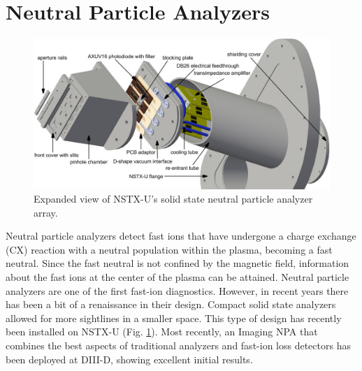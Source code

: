 \section{Neutral Particle Analyzers}
\begin{figure}[ht]
    \centering
    \includegraphics[width=12cm]{figures/nstx_npa.jpeg}
    \caption{Expanded view of NSTX-U's solid state neutral particle analyzer array.\cite{liu2014design}}
    \label{fig:npa}
\end{figure}
Neutral particle analyzers detect fast ions that have undergone a charge exchange (CX) reaction with a neutral population within the plasma, becoming a fast neutral. Since the fast neutral is not confined by the magnetic field, information about the fast ions at the center of the plasma can be attained. Neutral particle analyzers are one of the first fast-ion diagnostics\cite{artsimovich1969experiments}. However, in recent years there has been a bit of a renaissance in their design. Compact solid state analyzers\cite{zhu2012compact} allowed for more sightlines in a smaller space. This type of design has recently been installed on NSTX-U (Fig. \ref{fig:npa}). Most recently, an Imaging NPA that combines the best aspects of traditional analyzers and fast-ion loss detectors has been deployed at DIII-D, showing excellent initial results\cite{du2018inpa}.

